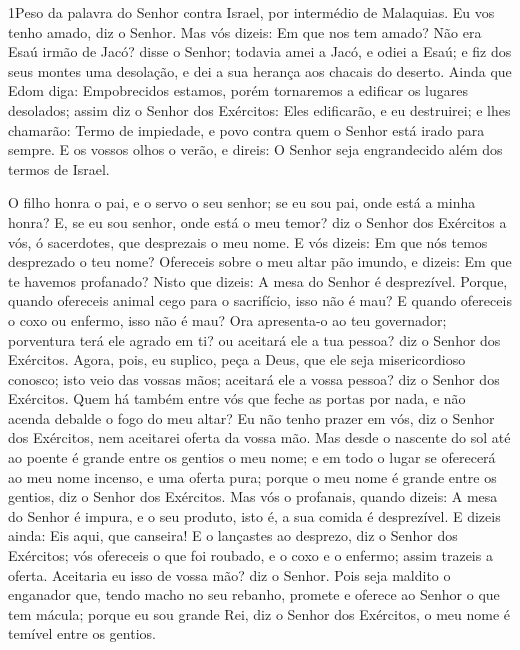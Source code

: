 
\lettrine{1} Peso da palavra do Senhor contra Israel, por
intermédio de Malaquias. Eu vos tenho amado, diz o Senhor. Mas
vós dizeis: Em que nos tem amado? Não era Esaú irmão de Jacó? disse
o Senhor; todavia amei a Jacó, e odiei a Esaú; e fiz dos seus
montes uma desolação, e dei a sua herança aos chacais do deserto.
Ainda que Edom diga: Empobrecidos estamos, porém tornaremos a
edificar os lugares desolados; assim diz o Senhor dos Exércitos:
Eles edificarão, e eu destruirei; e lhes chamarão: Termo de
impiedade, e povo contra quem o Senhor está irado para sempre. E
os vossos olhos o verão, e direis: O Senhor seja engrandecido além
dos termos de Israel.

O filho honra o pai, e o servo o seu senhor; se eu sou pai, onde
está a minha honra? E, se eu sou senhor, onde está o meu temor? diz
o Senhor dos Exércitos a vós, ó sacerdotes, que desprezais o meu
nome. E vós dizeis: Em que nós temos desprezado o teu nome?
Ofereceis sobre o meu altar pão imundo, e dizeis: Em que te
havemos profanado? Nisto que dizeis: A mesa do Senhor é desprezível.
Porque, quando ofereceis animal cego para o sacrifício, isso não
é mau? E quando ofereceis o coxo ou enfermo, isso não é mau? Ora
apresenta-o ao teu governador; porventura terá ele agrado em ti? ou
aceitará ele a tua pessoa? diz o Senhor dos Exércitos. Agora,
pois, eu suplico, peça a Deus, que ele seja misericordioso conosco;
isto veio das vossas mãos; aceitará ele a vossa pessoa? diz o Senhor
dos Exércitos. Quem há também entre vós que feche as portas
por nada, e não acenda debalde o fogo do meu altar? Eu não tenho
prazer em vós, diz o Senhor dos Exércitos, nem aceitarei oferta da
vossa mão. Mas desde o nascente do sol até ao poente é grande
entre os gentios o meu nome; e em todo o lugar se oferecerá ao meu
nome incenso, e uma oferta pura; porque o meu nome é grande entre os
gentios, diz o Senhor dos Exércitos. Mas vós o profanais,
quando dizeis: A mesa do Senhor é impura, e o seu produto, isto é, a
sua comida é desprezível. E dizeis ainda: Eis aqui, que
canseira! E o lançastes ao desprezo, diz o Senhor dos Exércitos; vós
ofereceis o que foi roubado, e o coxo e o enfermo; assim trazeis a
oferta. Aceitaria eu isso de vossa mão? diz o Senhor. Pois
seja maldito o enganador que, tendo macho no seu rebanho, promete e
oferece ao Senhor o que tem mácula; porque eu sou grande Rei, diz o
Senhor dos Exércitos, o meu nome é temível entre os gentios.

\medskip

